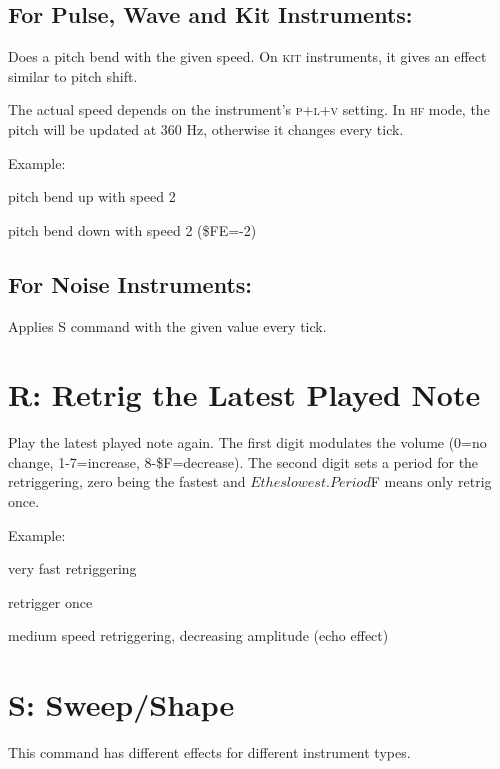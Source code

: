 \subsection{For Pulse, Wave and Kit Instruments:}

Does a pitch bend with the given speed. On \textsc{kit} instruments, it gives an effect similar to pitch shift.

The actual speed depends on the instrument's \textsc{p+l+v} setting. In \textsc{hf} mode, the pitch will be updated at 360 Hz, otherwise it changes every tick.

\begin{description}
\item Example:
\item[P02] pitch bend up with speed 2
\item[PFE] pitch bend down with speed 2 (\$FE=-2)
\end{description}

\subsection{For Noise Instruments:}

Applies S command with the given value every tick.

\section{R: Retrig the Latest Played Note}

Play the latest played note again. The first digit modulates the volume (0=no change, 1-7=increase, 8-\$F=decrease). The second digit sets a period for the retriggering, zero being the fastest and $E the slowest. Period $F means only retrig once.

\begin{description}
\item Example:
\item[R00] very fast retriggering
\item[R0F] retrigger once
\item[RF3] medium speed retriggering, decreasing amplitude (echo effect)
\end{description}

\section{S: Sweep/Shape}

This command has different effects for different instrument types.

